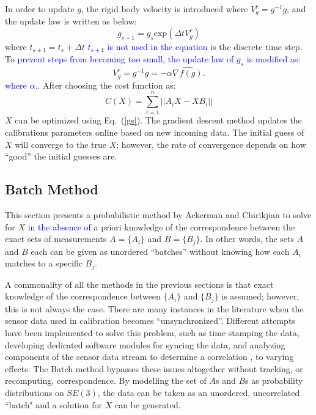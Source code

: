 \documentclass[twocolumn,10pt]{asme2ej}
\begin{document}
In order to update $g$, the rigid body velocity is introduced where $V^{r}_{g} = g^{-1}\dot{g}$, and the update law is written as below:
\begin{equation}
g_{s+1} = g_{s}\text{exp}(\Delta t V^{r}_{g})
\end{equation}
where $t_{s+1} = t_{s} + \Delta t$ \textcolor{blue}{$t_{s+1}$ is not used in the equation} is the discrete time step. To \textcolor{blue}{prevent steps from becoming too small, the update law of $g_s$ is modified as:}%
\begin{equation}
V^{r}_{g} = g^{-1}\dot{g} = -\alpha \widehat{\nabla f(g)}.
\label{gs}
\end{equation} 
\textcolor{blue}{where $\alpha..$}
After choosing the cost function as:
\begin{equation}
C(X) = \sum_{i=1}^{n}||A_{i}X - XB_{i}||
\end{equation}
$X$ can be optimized using Eq.~(\ref{gs}).
The gradient descent method updates the calibrations parameters online based on new incoming data. The initial guess of $X$ will converge to the true $X$; however, the rate of convergence depends on how ``good'' the initial guesses are.


\subsection{Batch Method}
\label{batchnoisefree}
This section presents a probabilistic method \cite{ackermanGSI} by Ackerman and Chirikjian to solve for $X$ \textcolor{blue}{in the absence of} %
a priori knowledge of the correspondence between the exact sets of measurements
$A = \{A_i\}$ and $B = \{B_j\}$. In other words, the sets $A$ and $B$ each can be given as unordered ``batches'' without knowing how each $A_i$ matches to a specific $B_j$.

A commonality of all the methods in the previous sections is that exact knowledge of the correspondence between $\{A_i\}$ and $\{B_j\}$ is assumed; however, this is not always the case. There are many instances in the literature when the sensor data used in calibration becomes ``unsynchronized''. Different attempts have been implemented to solve this problem, such as time stamping the data, developing dedicated software modules for syncing the data, and analyzing components of the sensor data stream to determine a correlation \cite{darius1}, to varying effects. The Batch method bypasses these issues altogether without tracking, or recomputing, correspondence. By modelling the set of $A$s and $B$s as probability distributions on $SE(3)$, the data can be taken as an unordered, uncorrelated ``batch" and a solution for $X$ can be generated.
\end{document}
